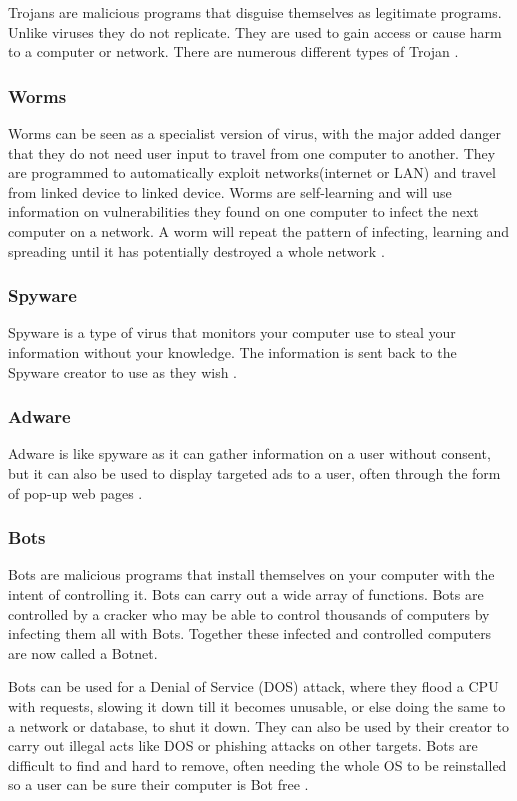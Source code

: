 \documentclass[11pt]{article}
\begin{document}
Trojans are malicious programs that disguise themselves as legitimate programs.  Unlike viruses they do not replicate.  They are used to gain access or cause harm to a computer or network.  There are numerous different types of Trojan \cite{Bas}.

\subsubsection{Worms}
Worms can be seen as a specialist version of virus, with the major added danger that they do not need user input to travel from one computer to another.  They are programmed to automatically exploit networks(internet or LAN) and travel from linked device to linked device. Worms are self-learning and will use information on vulnerabilities they found on one computer to infect the next computer on a network.  A worm will repeat the pattern of infecting, learning and spreading until it has potentially destroyed a whole network \cite{Bas}.

\subsubsection{Spyware}
Spyware is a type of virus that monitors your computer use to steal your information without your knowledge.  The information is sent back to the Spyware creator to use as they wish \cite{Bas}.

\subsubsection{Adware}
Adware is like spyware as it can gather information on a user without consent, but it can also be used to display targeted ads to a user, often through the form of pop-up web pages \cite{Bas}.

\subsubsection{Bots}
Bots are malicious programs that install themselves on your computer with the intent of controlling it.  Bots can carry out a wide array of functions.  Bots are controlled by a cracker who may be able to control thousands of computers by infecting them all with Bots.  Together these infected and controlled computers are now called a Botnet.

Bots can be used for a Denial of Service (DOS) attack, where they flood a CPU with requests, slowing it down till it becomes unusable, or else doing the same to a network or database, to shut it down.  They can also be used by their creator to carry out illegal acts like DOS or phishing attacks on other targets.  Bots are difficult to find and hard to remove, often needing the whole OS to be reinstalled so a user can be sure their computer is Bot free \cite{Bas}.
\end{document}
